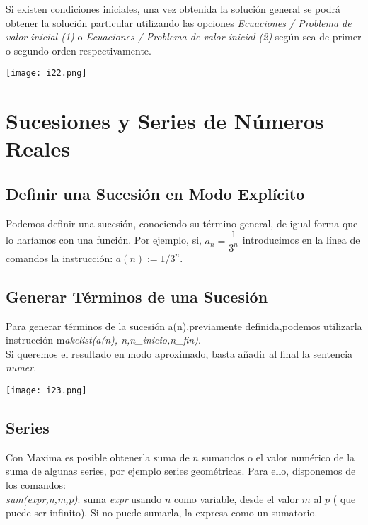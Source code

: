\documentclass[12pt]{article}
\begin{document}
Si existen condiciones iniciales,  una vez obtenida la solución general se podrá obtener la solución particular  utilizando  las opciones  \textit{Ecuaciones / Problema de valor inicial (1)}  o \textit{Ecuaciones / Problema de valor inicial (2)} según sea de primer o segundo orden respectivamente.

\begin{center}
   \texttt{[image: i22.png]}\\
\end{center}

\section*{Sucesiones y Series de Números Reales}
\subsection*{Definir una Sucesión en Modo Explícito}
Podemos definir una sucesión, conociendo su término general, de igual forma que lo haríamos con una función.  Por ejemplo, si, $a_n = \dfrac{1}{3^n}$ introducimos en la línea de comandos la instrucción: $a(n):= 1/3^n$.

\subsection*{Generar Términos de una Sucesión}
Para generar términos de la sucesión a(n),previamente definida,podemos utilizarla
instrucción m\textit{akelist(a(n), n,n\_inicio,n\_fin)}.\\

Si queremos el resultado en modo aproximado, basta añadir al final la sentencia \textit{numer}.

\begin{center}
   \texttt{[image: i23.png]}\\
\end{center}

\subsection*{Series}
Con Maxima es posible obtenerla suma de $n$ sumandos o el valor numérico de la suma de algunas series, por ejemplo series geométricas. Para ello, disponemos de los comandos:\\

 \textit{sum(expr,n,m,p)}: suma \textit{expr } usando $n$ como variable, desde el valor $m$ al $p$ ( que puede ser infinito). Si no puede sumarla, la expresa como un sumatorio.\\
 
\end{document}
